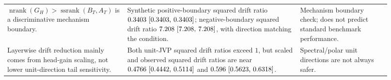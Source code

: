 \documentclass{article}
\theoremstyle{definition}
\newcommand{\nrank}{\operatorname{nrank}}
\newcommand{\ssrank}{\operatorname{ssrank}}
\begin{document}
\begin{table}[H]
\begin{tabular}{@{}>{\raggedright\arraybackslash}p{0.28\linewidth}>{\raggedright\arraybackslash}p{0.42\linewidth}>{\raggedright\arraybackslash}p{0.22\linewidth}@{}}
\addlinespace
\(\nrank(G_H)>\ssrank(B_T,A_T)\) is a discriminative mechanism boundary. &
Synthetic positive-boundary squared drift ratio \(0.3403 ~\text{[0.3403,\hspace{0.35em}0.3403]}\); negative-boundary squared drift ratio \(7.208 ~\text{[7.208,\hspace{0.35em}7.208]}\), with direction matching the condition. &
Mechanism boundary check; does not predict standard benchmark performance. \\
\addlinespace
Layerwise drift reduction mainly comes from head-gain scaling, not lower unit-direction tail sensitivity. &
Both unit-JVP squared drift ratios exceed \(1\), but scaled and observed squared drift ratios are near \(0.4766 ~\text{[0.4442,\hspace{0.35em}0.5114]}\) and \(0.596 ~\text{[0.5623,\hspace{0.35em}0.6318]}\). &
Spectral/polar unit directions are not always safer. \\
\bottomrule
\end{tabular}
\end{table}
\end{document}
